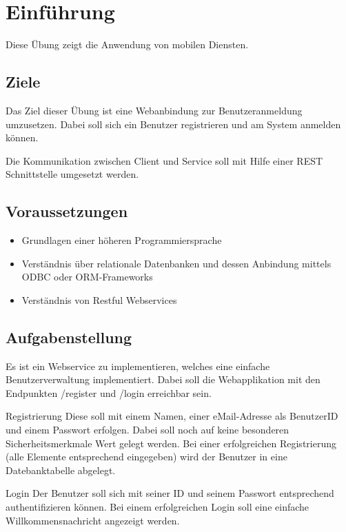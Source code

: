 
\section{Einführung}
    Diese Übung zeigt die Anwendung von mobilen Diensten.
    
    \subsection{Ziele}
        Das Ziel dieser Übung ist eine Webanbindung zur Benutzeranmeldung umzusetzen. Dabei soll sich ein Benutzer registrieren und am System anmelden können.
        
        Die Kommunikation zwischen Client und Service soll mit Hilfe einer REST Schnittstelle umgesetzt werden.

    \subsection{Voraussetzungen}
        \begin{itemize}
            \item Grundlagen einer höheren Programmiersprache
            \item Verständnis über relationale Datenbanken und dessen Anbindung mittels ODBC oder ORM-Frameworks
            \item Verständnis von Restful Webservices
        \end{itemize}

    \subsection{Aufgabenstellung}
        Es ist ein Webservice zu implementieren, welches eine einfache Benutzerverwaltung implementiert. Dabei soll die Webapplikation mit den Endpunkten /register und /login erreichbar sein.
        
        Registrierung
        Diese soll mit einem Namen, einer eMail-Adresse als BenutzerID und einem Passwort erfolgen. Dabei soll noch auf keine besonderen Sicherheitsmerkmale Wert gelegt werden. Bei einer erfolgreichen Registrierung (alle Elemente entsprechend eingegeben) wird der Benutzer in eine Datebanktabelle abgelegt.
        
        Login
        Der Benutzer soll sich mit seiner ID und seinem Passwort entsprechend authentifizieren können. Bei einem erfolgreichen Login soll eine einfache Willkommensnachricht angezeigt werden.
        
